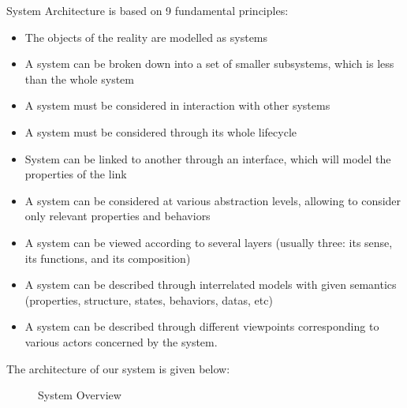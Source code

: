 System Architecture is based on 9 fundamental principles:
\begin{itemize}
	\item The objects of the reality are modelled as systems
	\item A system can be broken down into a set of smaller subsystems, which is less than the whole system
	\item A system must be considered in interaction with other systems
	\item A system must be considered through its whole lifecycle
	\item System can be linked to another through an interface, which will model the properties of the link
	\item A system can be considered at various abstraction levels, allowing to consider only relevant properties and behaviors
	\item A system can be viewed according to several layers (usually three: its sense, its functions, and its composition)
	\item A system can be described through interrelated models with given semantics (properties, structure, states, behaviors, datas, etc)
	\item A system can be described through different viewpoints corresponding to various actors concerned by the system.
\end{itemize}

The architecture of our system is given below:
\begin{figure}[htbp]
	\centering
	\caption{System Overview}
\end{figure}

